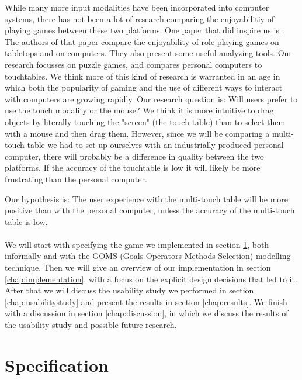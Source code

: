 \documentclass[a4paper,10pt]{report}
\begin{document}
While many more input modalities have been incorporated into computer systems, there has not been a lot of research comparing the enjoyabilitiy of playing games between these two platforms. 
One paper that did inspire us is \cite{Tychsen2007}.
The authors of that paper compare the enjoyability of role playing games on tabletops and on computers.
They also present some useful analyzing tools. 
Our research focusses on puzzle games, and compares personal computers to touchtables.
We think more of this kind of research is warranted in an age in which both the popularity of gaming and the use of different ways to interact with computers are growing rapidly.
Our research question is: Will users prefer to use the touch modality or the mouse? 
We think it is more intuitive to drag objects by literally touching the "screen" (the touch-table) than to select them with a mouse and then drag them.
However, since we will be comparing a multi-touch table we had to set up ourselves with an industrially produced personal computer, there will probably be a difference in quality between the two platforms. If the accuracy of the touchtable is low it will likely be more frustrating than the personal computer.

Our hypothesis is: The user experience with the multi-touch table will be more positive than with the personal computer, unless the accuracy of the multi-touch table is low. \\\\
We will start with specifying the game we implemented in section \ref{chap:specification}, both informally and with the  GOMS (Goals Operators Methods Selection) modelling technique. 
Then we will give an overview of our implementation in section \ref{chap:implementation}, with a focus on the explicit design decisions that led to it.
After that we will discuss the usability study we performed in section \ref{chap:usabilitystudy} and present the results in section \ref{chap:results}. 
We finish with a discussion in section \ref{chap:discussion}, in which we discuss the results of the usability study and possible future research. 

\chapter{Specification}
\label{chap:specification}
\end{document}
